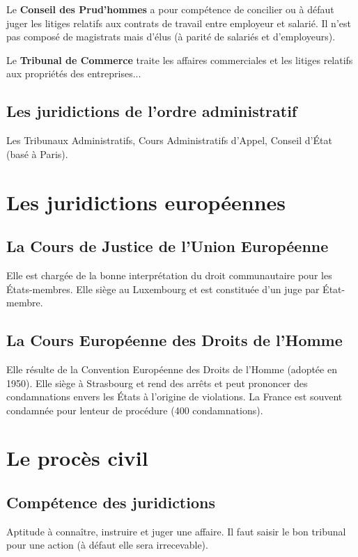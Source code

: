 \documentclass[10pt,a4paper]{article}
\begin{document}
Le \textbf{Conseil des Prud'hommes} a pour compétence de concilier ou à défaut juger les litiges relatifs aux contrats de travail entre employeur et salarié. Il n'est pas composé de magistrats mais d'élus (à parité de salariés et d'employeurs).

Le \textbf{Tribunal de Commerce} traite les affaires commerciales et les litiges relatifs aux propriétés des entreprises...

\subsection{Les juridictions de l'ordre administratif}

Les Tribunaux Administratifs, Cours Administratifs d'Appel, Conseil d'État (basé à Paris).

\section{Les juridictions européennes}

\subsection{La Cours de Justice de l'Union Européenne}

Elle est chargée de la bonne interprétation du droit communautaire pour les États-membres. Elle siège au Luxembourg et est constituée d'un juge par État-membre.

\subsection{La Cours Européenne des Droits de l'Homme}

Elle résulte de la Convention Européenne des Droits de l'Homme (adoptée en 1950). Elle siège à Strasbourg et rend des arrêts et peut prononcer des condamnations envers les États à l'origine de violations. La France est souvent condamnée pour lenteur de procédure (400 condamnations).

\section{Le procès civil}

\subsection{Compétence des juridictions}

Aptitude à connaître, instruire et juger une affaire. Il faut saisir le bon tribunal pour une action (à défaut elle sera irrecevable).
\end{document}
